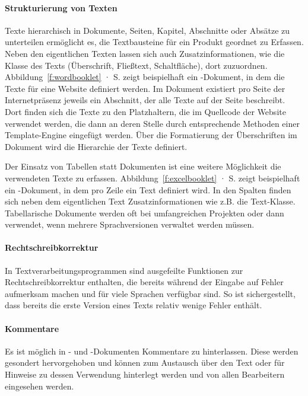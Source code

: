\paragraph{Strukturierung von Texten} Texte hierarchisch in Dokumente, Seiten, Kapitel, Abschnitte oder Absätze zu unterteilen ermöglicht es, die Textbausteine für ein Produkt geordnet zu Erfassen. Neben den eigentlichen Texten lassen sich auch Zusatzinformationen, wie die Klasse des Texts (Überschrift, Fließtext, Schaltfläche), dort zuzuordnen. Abbildung~\ref{f:wordbooklet} · S.\pageref{f:wordbooklet} zeigt beispielhaft ein -Dokument, in dem die Texte für eine Website definiert werden. Im Dokument existiert pro Seite der Internetpräsenz jeweils ein Abschnitt, der alle Texte auf der Seite beschreibt. Dort finden sich die Texte zu den Platzhaltern, die im Quellcode der Website verwendet werden, die dann an deren Stelle durch entsprechende Methoden einer Template-Engine eingefügt werden. Über die Formatierung der Überschriften im Dokument wird die Hierarchie der Texte definiert. 

Der Einsatz von Tabellen statt Dokumenten ist eine weitere Möglichkeit die verwendeten Texte zu erfassen. Abbildung~\ref{f:excelbooklet} · S.\pageref{f:excelbooklet} zeigt beispielhaft ein -Dokument, in dem pro Zeile ein Text definiert wird. In den Spalten finden sich neben dem eigentlichen Text Zusatzinformationen wie z.B. die Text-Klasse. Tabellarische Dokumente werden oft bei umfangreichen Projekten oder dann verwendet, wenn mehrere Sprachversionen verwaltet werden müssen.

\paragraph{Rechtschreibkorrektur} In Textverarbeitungsprogrammen sind ausgefeilte Funktionen zur Rechtschreibkorrektur enthalten, die bereits während der Eingabe auf Fehler aufmerksam machen und für viele Sprachen verfügbar sind. So ist sichergestellt, dass bereits die erste Version eines Texts relativ wenige Fehler enthält.

\paragraph{Kommentare} Es ist möglich in - und -Dokumenten Kommentare zu hinterlassen. Diese werden gesondert hervorgehoben und können zum Austausch über den Text oder für Hinweise zu dessen Verwendung hinterlegt werden und von allen Bearbeitern eingesehen werden.

